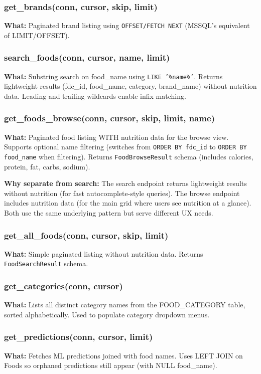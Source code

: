 \documentclass[12pt,a4paper]{article}
\begin{document}
\subsubsection{get\_brands(conn, cursor, skip, limit)}
\textbf{What:} Paginated brand listing using \texttt{OFFSET/FETCH NEXT} (MSSQL's equivalent of LIMIT/OFFSET).

\subsubsection{search\_foods(conn, cursor, name, limit)}
\textbf{What:} Substring search on food\_name using \texttt{LIKE '\%name\%'}. Returns lightweight results (fdc\_id, food\_name, category, brand\_name) without nutrition data. Leading and trailing wildcards enable infix matching.

\subsubsection{get\_foods\_browse(conn, cursor, skip, limit, name)}
\textbf{What:} Paginated food listing WITH nutrition data for the browse view. Supports optional name filtering (switches from \texttt{ORDER BY fdc\_id} to \texttt{ORDER BY food\_name} when filtering). Returns \texttt{FoodBrowseResult} schema (includes calories, protein, fat, carbs, sodium).

\textbf{Why separate from search:} The search endpoint returns lightweight results without nutrition (for fast autocomplete-style queries). The browse endpoint includes nutrition data (for the main grid where users see nutrition at a glance). Both use the same underlying pattern but serve different UX needs.

\subsubsection{get\_all\_foods(conn, cursor, skip, limit)}
\textbf{What:} Simple paginated listing without nutrition data. Returns \texttt{FoodSearchResult} schema.

\subsubsection{get\_categories(conn, cursor)}
\textbf{What:} Lists all distinct category names from the FOOD\_CATEGORY table, sorted alphabetically. Used to populate category dropdown menus.

\subsubsection{get\_predictions(conn, cursor, limit)}
\textbf{What:} Fetches ML predictions joined with food names. Uses LEFT JOIN on Foods so orphaned predictions still appear (with NULL food\_name).
\end{document}
